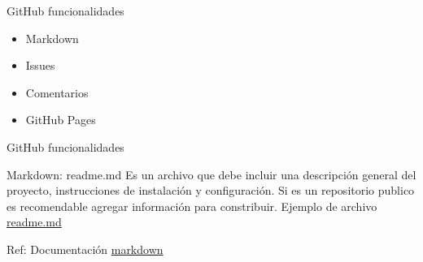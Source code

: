 \documentclass{beamer}
\begin{document}
\begin{frame}{GitHub funcionalidades}

  \begin{itemize}
    \LARGE
    \item Markdown
    \item Issues 
    \item Comentarios
    \item GitHub Pages
  \end{itemize}

\end{frame}


\begin{frame}{GitHub funcionalidades}

  \begin{exampleblock}{Markdown: readme.md}
    Es un archivo que debe incluir una descripción general del proyecto, instrucciones de instalación y configuración. 
    Si es un repositorio publico es recomendable agregar información para constribuir.
    Ejemplo de archivo \href{https://github.com/paobtorres/sistemas_dinamicos_I}{readme.md}
  \end{exampleblock}


  Ref: Documentación \href{https://docs.github.com/es/get-started/writing-on-github/getting-started-with-writing-and-formatting-on-github/quickstart-for-writing-on-github}{markdown}

\end{frame}
\end{document}
